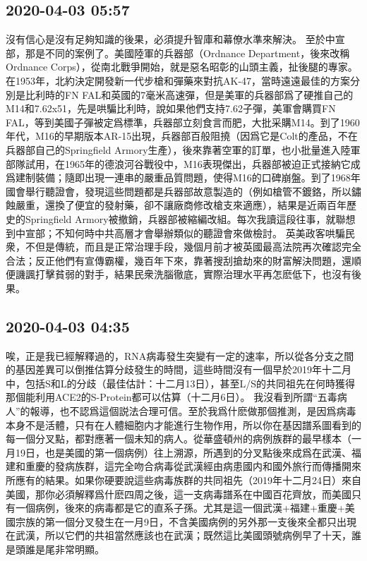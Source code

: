 \documentclass[twocolumn]{ctexart}
\begin{document}
\subsection*{2020-04-03 05:57}

沒有信心是沒有足夠知識的後果，必須提升智庫和幕僚水準來解決。
至於中宣部，那是不同的案例了。美國陸軍的兵器部（Ordnance Department，後來改稱Ordnance Corps），從南北戰爭開始，就是惡名昭彰的山頭主義，扯後腿的專家。在1953年，北約決定開發新一代步槍和彈藥來對抗AK-47，當時遠遠最佳的方案分別是比利時的FN FAL和英國的7毫米高速彈，但是美軍的兵器部爲了硬推自己的M14和7.62x51，先是哄騙比利時，說如果他們支持7.62子彈，美軍會購買FN FAL，等到美國子彈被定爲標準，兵器部立刻食言而肥，大批采購M14。到了1960年代，M16的早期版本AR-15出現，兵器部百般阻撓（因爲它是Colt的產品，不在兵器部自己的Springfield Armory生產），後來靠著空軍的訂單，也小批量進入陸軍部隊試用，在1965年的德浪河谷戰役中，M16表現傑出，兵器部被迫正式接納它成爲建制裝備；隨即出現一連串的嚴重品質問題，使得M16的口碑崩盤。到了1968年國會舉行聽證會，發現這些問題都是兵器部故意製造的（例如槍管不鍍鉻，所以鏽蝕嚴重，還換了便宜的發射藥，卻不讓廠商修改槍支來適應），結果是近兩百年歷史的Springfield Armory被撤銷，兵器部被縮編改組。每次我讀這段往事，就聯想到中宣部；不知何時中共高層才會舉辦類似的聽證會來做檢討。
英美政客哄騙民衆，不但是傳統，而且是正常治理手段，幾個月前才被英國最高法院再次確認完全合法；反正他們有宣傳霸權，幾百年下來，靠著搜刮搶劫來的財富解決問題，還順便譏諷打擊貧弱的對手，結果民衆洗腦徹底，實際治理水平再怎麽低下，也沒有後果。
\subsection*{2020-04-03 04:35}

唉，正是我已經解釋過的，RNA病毒發生突變有一定的速率，所以從各分支之間的基因差異可以倒推估算分歧發生的時間，這些時間沒有一個早於2019年十二月中，包括S和L的分歧（最佳估計：十二月13日），甚至L/S的共同祖先在何時獲得那個能利用ACE2的S-Protein都可以估算（十二月6日）。
我沒看到所謂“五毒病人”的報導，也不認爲這個説法合理可信。至於我爲什麽做那個推測，是因爲病毒本身不是活體，只有在人體細胞内才能進行生物作用，所以你在基因譜系圖看到的每一個分叉點，都對應著一個未知的病人。從華盛頓州的病例族群的最早樣本（一月19日，也是美國的第一個病例）往上溯源，所遇到的分叉點後來成爲在武漢、福建和重慶的發病族群，這完全吻合病毒從武漢經由病患國内和國外旅行而傳播開來所應有的結果。如果你硬要說這些病毒族群的共同祖先（2019年十二月24日）來自美國，那你必須解釋爲什麽四周之後，這一支病毒譜系在中國百花齊放，而美國只有一個病例，後來的病毒都是它的直系子孫。尤其是這一個武漢+福建+重慶+美國宗族的第一個分叉發生在一月9日，不含美國病例的另外那一支後來全都只出現在武漢，所以它們的共祖當然應該也在武漢；既然這比美國頭號病例早了十天，誰是頭誰是尾非常明顯。
\end{document}

